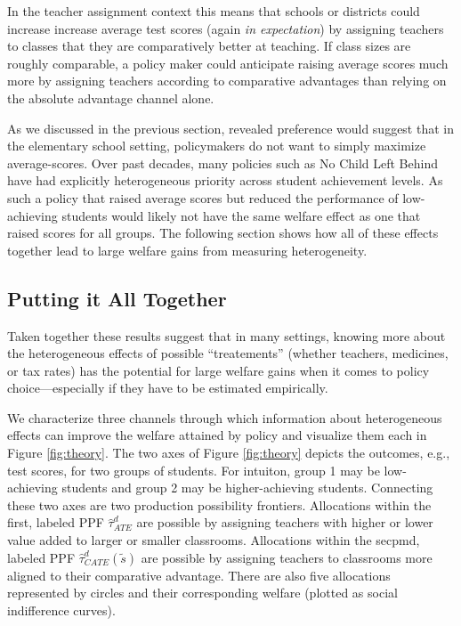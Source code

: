 \documentclass[12pt]{article}
\theoremstyle{definition}
\theoremstyle{definition}
\theoremstyle{definition}
\theoremstyle{definition}
\begin{document}
    In the teacher assignment context this means that schools or districts could increase increase average test scores (again \textit{in expectation}) by assigning teachers to classes that they are comparatively better at teaching. If class sizes are roughly comparable, a policy maker could anticipate raising average scores much more by assigning teachers according to comparative advantages than relying on the absolute advantage channel alone.
    
    As we discussed in the previous section, revealed preference would suggest that in the elementary school setting, policymakers do not want to simply maximize average-scores. Over past decades, many policies such as No Child Left Behind have had explicitly heterogeneous priority across student achievement levels. As such a policy that raised average scores but reduced the performance of low-achieving students would likely not have the same welfare effect as one that raised scores for all groups. The following section shows how all of these effects together lead to large welfare gains from measuring heterogeneity. 

\subsection{Putting it All Together}
Taken together these results suggest that in many settings, knowing more about the heterogeneous effects of possible ``treatements'' (whether teachers, medicines, or tax rates) has the potential for large welfare gains when it comes to policy choice---especially if they have to be estimated empirically.


We characterize three channels through which information about heterogeneous effects can improve the welfare attained by policy and visualize them each in Figure \ref{fig:theory}. The two axes of Figure \ref{fig:theory} depicts the outcomes, e.g., test scores, for two groups of students. For intuiton, group 1 may be low-achieving students and group 2 may be higher-achieving students. Connecting these two axes are two production possibility frontiers. Allocations within the first, labeled PPF $\hat{\tau}^d_{ATE}$ are possible by assigning teachers with higher or lower value added to larger or smaller classrooms. Allocations within the secpmd, labeled PPF $\hat{\tau}^d_{CATE}(\tilde{s})$ are possible by assigning teachers to classrooms more aligned to their comparative advantage. There are also five allocations represented by circles and their corresponding welfare (plotted as social indifference curves).
\end{document}

